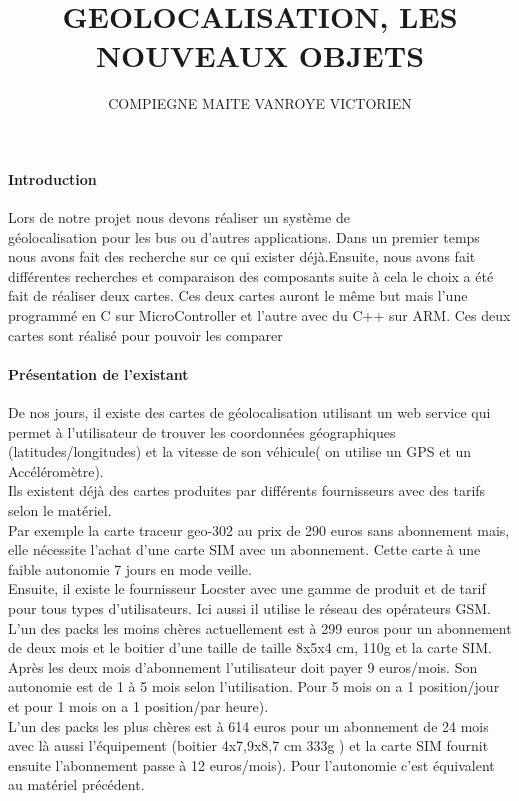 \documentclass[10pt,a4paper]{article}
\author{COMPIEGNE MAITE VANROYE VICTORIEN}
\title{GEOLOCALISATION, LES NOUVEAUX OBJETS}
\begin{document}
\paragraph{Introduction}
Lors de notre projet nous devons réaliser un système de\\ géolocalisation pour les bus ou d'autres applications. Dans un premier temps nous avons fait des recherche sur ce qui exister déjà.Ensuite, nous avons fait différentes recherches et comparaison des composants suite à cela le choix a été fait de réaliser deux cartes. Ces deux cartes auront le même but mais l'une programmé en C sur MicroController et l'autre avec du C++ sur ARM. Ces deux cartes sont réalisé pour pouvoir les comparer   

\paragraph{Présentation de l'existant}
De nos jours, il existe des cartes de géolocalisation utilisant un web service qui permet à l'utilisateur de trouver les coordonnées géographiques (latitudes/longitudes) et la vitesse de son véhicule( on utilise un GPS et un Accéléromètre).\\Ils existent déjà des cartes produites par différents fournisseurs avec des tarifs selon le matériel.\\Par exemple la carte traceur geo-302 au prix de 290 euros sans abonnement mais, elle nécessite l'achat d'une carte SIM avec un abonnement. Cette carte à une faible autonomie 7 jours en mode veille.\\Ensuite, il existe le fournisseur Locster avec une gamme de produit et de tarif pour tous types d'utilisateurs. Ici aussi il utilise le réseau des opérateurs GSM.\\L'un des packs les moins chères actuellement est à 299 euros pour un abonnement de deux mois et le boitier d'une taille de taille 8x5x4 cm, 110g et la carte SIM. Après les deux mois d'abonnement l'utilisateur doit payer 9 euros/mois. Son autonomie est de 1 à 5 mois selon l'utilisation. Pour 5 mois on a 1 position/jour et pour 1 mois on a 1 position/par heure).\\L'un des packs les plus chères est à 614 euros pour un abonnement de 24 mois avec là aussi l'équipement (boitier 4x7,9x8,7 cm 333g ) et la carte SIM fournit ensuite l'abonnement passe à 12 euros/mois). Pour l'autonomie c'est équivalent au matériel précédent. 
\end{document}
